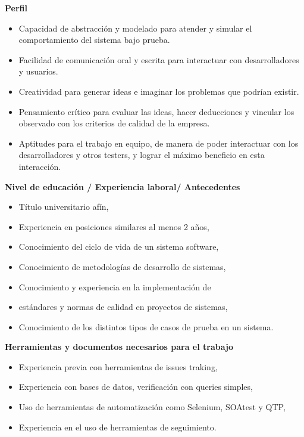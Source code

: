 \begin{itemize}
            \item \textbf{Perfil}
            \begin{itemize}
				\item Capacidad de abstracción y modelado para atender y simular el comportamiento del sistema bajo prueba.
                \item Facilidad de comunicación oral y escrita para interactuar con desarrolladores y usuarios.
                \item Creatividad para generar ideas e imaginar los problemas que podrían existir.
                \item Pensamiento crítico para evaluar las ideas, hacer deducciones y vincular los observado con los criterios de calidad de la empresa.
                \item Aptitudes para el trabajo en equipo, de manera de poder interactuar con los desarrolladores y otros testers, y lograr el máximo beneficio en esta interacción.
            \end{itemize}
            {\correccionTexto
            \item \textbf{Nivel de educación / Experiencia laboral/ Antecedentes}
                \begin{itemize}
                    \item Título universitario afín, 
					\item Experiencia en posiciones similares al menos 2 años,
					\item Conocimiento del ciclo de vida de un sistema software, 
					\item Conocimiento de metodologías de desarrollo de sistemas, 
					\item Conocimiento y experiencia en la implementación de 							\item estándares y normas de calidad en proyectos de sistemas, 
					\item Conocimiento de los distintos tipos de casos de prueba en un sistema.
                \end{itemize}
            \item \textbf{Herramientas y documentos necesarios para el trabajo}
            	\begin{itemize}
                    \item Experiencia previa con herramientas de issues traking,
					\item Experiencia con bases de datos, verificación con queries simples,
					\item Uso de herramientas de automatización como Selenium, SOAtest y QTP,
					\item Experiencia en el uso de herramientas de seguimiento.
                \end{itemize}
            }
			\end{itemize}    
    
